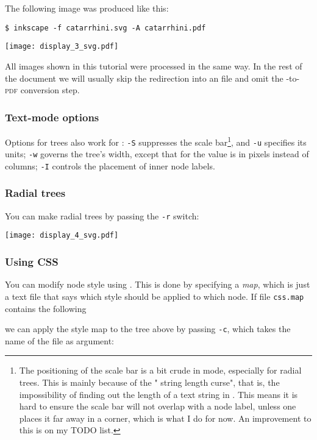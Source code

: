 The following \pdf{} image was produced like this:

\begin{verbatim}
$ inkscape -f catarrhini.svg -A catarrhini.pdf
\end{verbatim}

\begin{center}
 \texttt{[image: display\_3\_svg.pdf]}
\end{center}
All \svg{} images shown in this tutorial were processed in the same way. In the
rest of the document we will usually skip the redirection into an \svg{} file
and omit the \svg{}-to-\textsc{pdf} conversion step.

\subsubsection{Text-mode options}

Options for \ascii{} trees also work for \svg{}: \texttt{-S} suppresses the
scale bar\footnote{The positioning of the scale bar is a bit crude in \svg{}
mode, especially for radial trees. This is mainly because of the "\svg{} string
length curse", that is, the impossibility of finding out the length of a text
string in \svg.  This means it is hard to ensure the scale bar will not overlap
with a node label, unless one places it far away in a corner, which is what I do
for now. An improvement to this is on my TODO list.}, and \texttt{-u} specifies
its units; \texttt{-w} governs the tree's width, except that for \svg{} the
value is in pixels instead of columns; \texttt{-I} controls the placement of inner node
labels. 

\subsubsection{Radial trees}

You can make radial trees by passing the \texttt{-r} switch:

\begin{center}
\texttt{[image: display\_4\_svg.pdf]}
\end{center}

\subsubsection{Using CSS}
\label{sct_display_svg_css}

You can modify node style using \css. This is done by specifying a
\textit{\css{} map}, which is just a text file that says which style should be
applied to which node. If file \texttt{css.map} contains the following
\begin{quote}

\end{quote} we can apply the style map to
the tree above by passing \texttt{-c}, which takes the name of the \css{} file
as argument:

